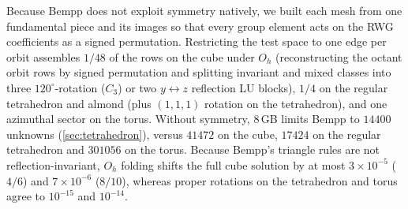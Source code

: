Because Bempp does not exploit symmetry natively, we built each mesh from one fundamental piece and its images so that every group element acts on the RWG coefficients as a signed permutation. Restricting the test space to one edge per orbit assembles $1/48$ of the rows on the cube under $O_h$ (reconstructing the octant orbit rows by signed permutation and splitting invariant and mixed classes into three $120^\circ$-rotation ($C_3$) or two $y\leftrightarrow z$ reflection LU blocks), $1/4$ on the regular tetrahedron and almond (plus $(1,1,1)$ rotation on the tetrahedron), and one azimuthal sector on the torus. Without symmetry, $8$\,GB limits Bempp to $14400$ unknowns (\autoref{sec:tetrahedron}), versus $41472$ on the cube, $17424$ on the regular tetrahedron and $301056$ on the torus. Because Bempp's triangle rules are not reflection-invariant, $O_h$ folding shifts the full cube solution by at most $3\times10^{-5}$ ($4/6$) and $7\times10^{-6}$ ($8/10$), whereas proper rotations on the tetrahedron and torus agree to $10^{-15}$ and $10^{-14}$.


